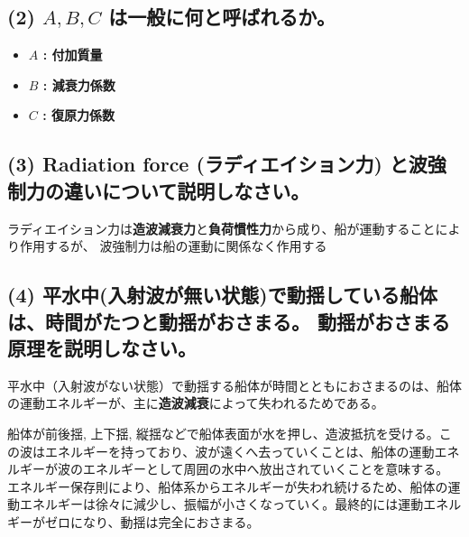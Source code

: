 \documentclass[dvipdfmx,a4paper]{jsarticle}
\begin{document}
\subsection*{(2) $A, B, C$ は一般に何と呼ばれるか。}
\begin{itemize}
    \item \textbf{$A$ : 付加質量} 
    \item \textbf{$B$ : 減衰力係数}
    \item \textbf{$C$ : 復原力係数} 
\end{itemize}

\subsection*{(3) Radiation force (ラディエイション力) と波強制力の違いについて説明しなさい。}
ラディエイション力は\textbf{造波減衰力}と\textbf{負荷慣性力}から成り、船が運動することにより作用するが、
波強制力は船の運動に関係なく作用する

\subsection*{(4) 平水中(入射波が無い状態)で動揺している船体は、時間がたつと動揺がおさまる。 動揺がおさまる原理を説明しなさい。}
平水中（入射波がない状態）で動揺する船体が時間とともにおさまるのは、船体の運動エネルギーが、主に\textbf{造波減衰}によって失われるためである。

船体が前後揺, 上下揺, 縦揺などで船体表面が水を押し、造波抵抗を受ける。この波はエネルギーを持っており、波が遠くへ去っていくことは、船体の運動エネルギーが波のエネルギーとして周囲の水中へ放出されていくことを意味する。
エネルギー保存則により、船体系からエネルギーが失われ続けるため、船体の運動エネルギーは徐々に減少し、振幅が小さくなっていく。最終的には運動エネルギーがゼロになり、動揺は完全におさまる。
\vfill
\end{document}
